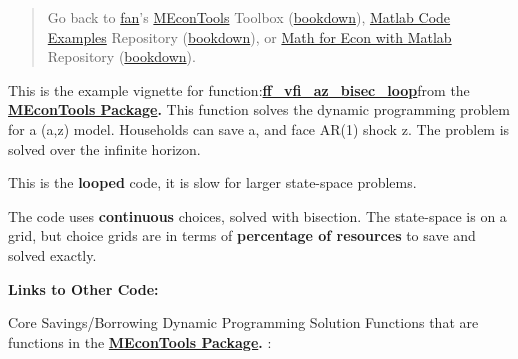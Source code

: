 \documentclass[
]{book}
\begin{document}
\begin{quote}
Go back to \href{http://fanwangecon.github.io/}{fan}'s \href{https://fanwangecon.github.io/MEconTools/}{MEconTools} Toolbox (\href{https://fanwangecon.github.io/MEconTools/bookdown}{bookdown}), \href{https://fanwangecon.github.io/M4Econ/}{Matlab Code Examples} Repository (\href{https://fanwangecon.github.io/M4Econ/bookdown}{bookdown}), or \href{https://fanwangecon.github.io/Math4Econ/}{Math for Econ with Matlab} Repository (\href{https://fanwangecon.github.io/Math4Econ/bookdown}{bookdown}).
\end{quote}

This is the example vignette for function:\href{https://github.com/FanWangEcon/MEconTools/blob/master/MEconTools/vfi/ff_vfi_az_bisec_loop.m}{\textbf{ff\_vfi\_az\_bisec\_loop}}from
the \href{https://fanwangecon.github.io/MEconTools/}{\textbf{MEconTools
Package}}\textbf{.} This function
solves the dynamic programming problem for a (a,z) model. Households can
save a, and face AR(1) shock z. The problem is solved over the infinite
horizon.

This is the \textbf{looped} code, it is slow for larger state-space problems.

The code uses \textbf{continuous} choices, solved with bisection. The
state-space is on a grid, but choice grids are in terms of \textbf{percentage
of resources} to save and solved exactly.

\textbf{Links to Other Code:}

Core Savings/Borrowing Dynamic Programming Solution Functions that are
functions in the \href{https://fanwangecon.github.io/MEconTools/}{\textbf{MEconTools
Package}}\textbf{.} :
\end{document}
